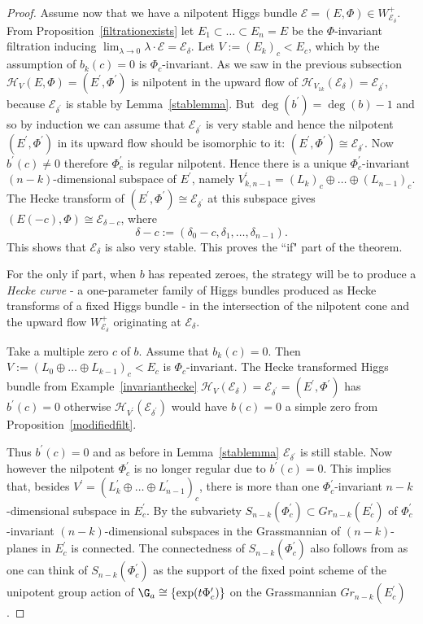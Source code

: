 \documentclass[12pt]{article}
\numberwithin{equation}{section}
\theoremstyle{remark}
\theoremstyle{definition}
\numberwithin{theorem}{section}
\def\calE{{\mathcal E}}
\def\calH{\mathcal{H}}
\def\d{{{\delta}}}
\renewcommand{\1}{\mathbbm{1}}
\begin{document}
\begin{proof}
	Assume now that we have a nilpotent Higgs bundle $\calE=(E,\Phi)\in W^+_{\calE_{\d}}$. From Proposition~\ref{filtrationexists} let $E_1\subset\dots\subset E_n=E$ be the $\Phi$-invariant filtration  inducing $\lim_{\lambda\to 0}\lambda\cdot \calE=\calE_{\d}$. Let $V:=(E_{k})_c<E_c$, which by the assumption of $b_k(c)=0$ is $\Phi_c$-invariant. As we saw in the previous subsection $\calH_V(E,\Phi)=(E^\prime,\Phi^\prime)$ is nilpotent in the upward flow of $\calH_{V_{1k}}(\calE_{\d})=\calE_{\d^\prime}$, because $\calE_{\d^\prime}$ is stable by Lemma~\ref{stablemma}. But $\deg(b^\prime)=\deg(b)-1$ and so by induction we can assume that $\calE_{\d^\prime}$ is very stable and hence the nilpotent $(E^\prime,\Phi^\prime)$ in its upward flow should be isomorphic to it: $(E^\prime,\Phi^\prime)\cong \calE_{\d^\prime}$. Now $b^\prime(c)\neq 0$ therefore $\Phi^\prime_c$ is regular nilpotent. Hence there is a unique $\Phi^\prime_c$-invariant $(n-k)$-dimensional subspace of $E^\prime$, namely $V^\prime_{k,n-1}=(L_{k})_c\oplus \dots\oplus (L_{n-1})_c$. The Hecke transform of $(E^\prime,\Phi^\prime)\cong \calE_{\d^\prime}$ at this subspace gives $(E(-c),\Phi)\cong\calE_{\delta-c}$, where $$\delta-c:=(\delta_0-c,\delta_1,\dots,\delta_{n-1}).$$ This shows that $\calE_{\d}$ is also very stable. This proves the ``if" part of the theorem.
	
	For the only if part, when $b$ has repeated zeroes, the strategy will be to produce a {\em Hecke curve} \cite{NR} - a one-parameter family of Higgs bundles produced as Hecke transforms of a fixed Higgs bundle -   in the intersection of the nilpotent cone and the upward flow $W^+_{\calE_{\d}}$ originating at $\calE_{\d}$. 
	
	Take a multiple zero $c$ of $b$. Assume that $b_k(c)=0$. Then $V:=(L_0\oplus \dots \oplus L_{k-1})_c<E_c$ is $\Phi_c$-invariant. The Hecke transformed Higgs bundle from Example~\ref{invarianthecke} $\calH_{V}(\calE_{\d})=\calE_{\d^\prime}=(E^\prime,\Phi^\prime)$ has  $b^\prime(c)=0$ otherwise $\calH_{V^\prime}(\calE_{\d^\prime})$ would have $b(c)=0$ a simple zero from Proposition~\ref{modifiedfilt}. 
	
	Thus $b^\prime(c)=0$ and as before in Lemma~\ref{stablemma} $\calE_{\d^\prime}$ is still stable. Now however the nilpotent $\Phi^\prime_c$ is no longer regular due to $b^\prime(c)=0$. This implies that, besides $V^\prime=(L^\prime_{k}\oplus \dots \oplus L^\prime_{n-1})_c$,  
	there is more than one $\Phi^\prime_c$-invariant $n-k$-dimensional subspace in $E^\prime_c$.  By \cite[Theorem 6]{shayman} the subvariety $S_{n-k}(\Phi^\prime_c)\subset Gr_{n-k}(E^\prime_c)$  of $\Phi^\prime_c$-invariant $(n-k)$-dimensional subspaces in the Grassmannian  of $(n-k)$-planes in $E^\prime_c$ is connected. The connectedness of $S_{n-k}(\Phi^\prime_c)$ also follows from \cite[Theorem 6.2]{horrocks} as one can think of $S_{n-k}(\Phi^\prime_c)$ as the support of the fixed point scheme of the unipotent group action of $\G_a\cong \{\exp(t \Phi^\prime_c)\}$ on the Grassmannian $Gr_{n-k}(E^\prime_c)$.
	

\end{proof}
\end{document}
